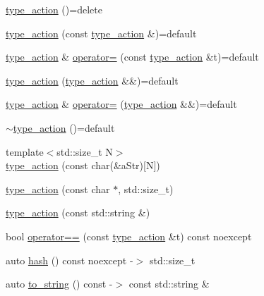 \begin{DoxyCompactItemize}
\item 
\hyperlink{classactor__zeta_1_1behavior_1_1type__action_a2684aef901ba95f08c26234dc5efde8c}{type\+\_\+action} ()=delete
\item 
\hyperlink{classactor__zeta_1_1behavior_1_1type__action_a463568dc753fb94928762d63a9e77bbe}{type\+\_\+action} (const \hyperlink{classactor__zeta_1_1behavior_1_1type__action}{type\+\_\+action} \&)=default
\item 
\hyperlink{classactor__zeta_1_1behavior_1_1type__action}{type\+\_\+action} \& \hyperlink{classactor__zeta_1_1behavior_1_1type__action_ac6d0744593acdee1755bf4c8647142e0}{operator=} (const \hyperlink{classactor__zeta_1_1behavior_1_1type__action}{type\+\_\+action} \&t)=default
\item 
\hyperlink{classactor__zeta_1_1behavior_1_1type__action_a09c272ebf6681a7abf16e96a40b00e68}{type\+\_\+action} (\hyperlink{classactor__zeta_1_1behavior_1_1type__action}{type\+\_\+action} \&\&)=default
\item 
\hyperlink{classactor__zeta_1_1behavior_1_1type__action}{type\+\_\+action} \& \hyperlink{classactor__zeta_1_1behavior_1_1type__action_a9c0705753fc6a12e1e264e58623669b5}{operator=} (\hyperlink{classactor__zeta_1_1behavior_1_1type__action}{type\+\_\+action} \&\&)=default
\item 
\hyperlink{classactor__zeta_1_1behavior_1_1type__action_a7ae1be97143d5d4b3c04dd4761ca56f9}{$\sim$type\+\_\+action} ()=default
\item 
{\footnotesize template$<$std\+::size\+\_\+t N$>$ }\\\hyperlink{classactor__zeta_1_1behavior_1_1type__action_a19d364a67100c9e9c6c4bd0619a23dcf}{type\+\_\+action} (const char(\&a\+Str)\mbox{[}N\mbox{]})
\item 
\hyperlink{classactor__zeta_1_1behavior_1_1type__action_a271663f992dbe82047cb37a742138376}{type\+\_\+action} (const char $\ast$, std\+::size\+\_\+t)
\item 
\hyperlink{classactor__zeta_1_1behavior_1_1type__action_a0406af5cd674a0ae8267764dfd3dc7c2}{type\+\_\+action} (const std\+::string \&)
\item 
bool \hyperlink{classactor__zeta_1_1behavior_1_1type__action_a852901cc2a9a35ede73535701e28eda2}{operator==} (const \hyperlink{classactor__zeta_1_1behavior_1_1type__action}{type\+\_\+action} \&t) const noexcept
\item 
auto \hyperlink{classactor__zeta_1_1behavior_1_1type__action_a60c1a881e40facb9390faed4b54ea5c7}{hash} () const noexcept -\/$>$ std\+::size\+\_\+t
\item 
auto \hyperlink{classactor__zeta_1_1behavior_1_1type__action_aea8bf387fe61053322c0862f0f7c7f09}{to\+\_\+string} () const -\/$>$ const std\+::string \&
\end{DoxyCompactItemize}


